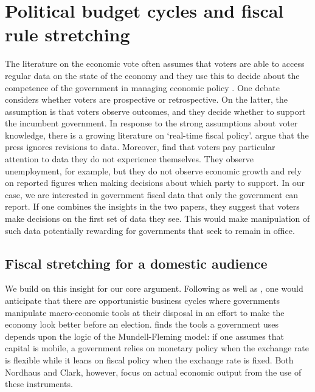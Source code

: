 \documentclass[]{article}
\begin{document}

\section{Political budget cycles and fiscal rule stretching}

The literature on the economic vote often assumes that voters are able to access regular data on the state of the economy and they use this to decide about the competence of the government in managing economic policy \citep[for a discussion see][]{Ansolabehere2014}. One debate considers whether voters are prospective or retrospective. On the latter, the assumption is that voters observe outcomes, and they decide whether to support the incumbent government. In response to the strong assumptions about voter knowledge, there is a growing literature on `real-time fiscal policy'. \cite{KayserLeininger2015} argue that the press ignores revisions to data. Moreover, \cite{kayser_peress} find that voters pay particular attention to data they do not experience themselves. They observe unemployment, for example, but they do not observe economic growth and rely on reported figures when making decisions about which party to support. In our case, we are interested in government fiscal data that only the government can report. If one combines the insights in the two papers, they suggest that voters make decisions on the first set of data they see. This would make manipulation of such data potentially rewarding for governments that seek to remain in office.

\subsection{Fiscal stretching for a domestic audience}

We build on this insight for our core argument. Following \cite{nordhaus1975} as well as \cite{Alt2014}, one would anticipate that there are opportunistic business cycles where governments manipulate macro-economic tools at their disposal in an effort to make the economy look better before an election. \cite{clark2003} finds the tools a government uses depends upon the logic of the Mundell-Fleming model: if one assumes that capital is mobile, a government relies on monetary policy when the exchange rate is flexible while it leans on fiscal policy when the exchange rate is fixed. Both Nordhaus and Clark, however, focus on actual economic output from the use of these instruments.
\end{document}
